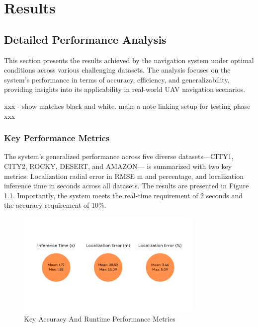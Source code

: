 
\chapter{Results}

\section{Detailed Performance Analysis}

This section presents the results achieved by the navigation system under optimal conditions across various challenging datasets. The analysis focuses on the system's performance in terms of accuracy, efficiency, and generalizability, providing insights into its applicability in real-world UAV navigation scenarios.

xxx - show matches black and white. 
make a note linking setup for testing phase xxx
\subsection{Key Performance Metrics}

The system's generalized performance across five diverse datasets—CITY1, CITY2, ROCKY, DESERT, and AMAZON— is summarized with two key metrics: Localization radial error in RMSE m and percentage, and localization inference time in seconds across all datasets. The results are presented in Figure \ref{fig:Key Metrics}. Importantly, the system meets the real-time requirement of 2 seconds and the accuracy requirement of 10\%. 

\begin{figure}[H]
    \centering
    \includegraphics[width=0.8\textwidth]{./Chapter 5/RESULTPLOTS/Metrics_Raw.png}
    \caption{Key Accuracy And Runtime Performance Metrics}
    \label{fig:Key Metrics}
\end{figure}





